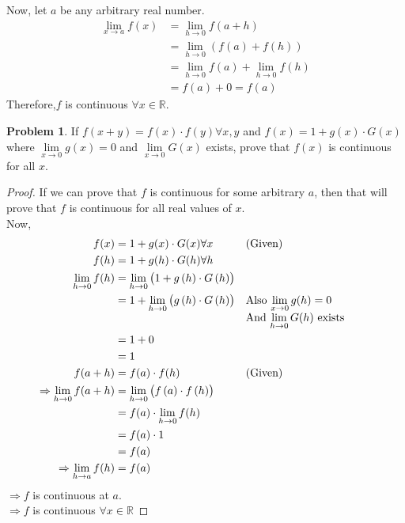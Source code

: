 \documentclass[14]{article}
\theoremstyle{definition}
\newtheorem{prob}{Problem}
\theoremstyle{case}
\begin{document}
Now, let $a$ be any arbitrary real number.
\begin{align*}
\lim\limits_{x \to a} f(x) &= \lim\limits_{h \to 0} f(a + h)\\
&= \lim\limits_{h \to 0} \left( f(a) + f(h) \right)\\
&= \lim\limits_{h \to 0} f(a) + \lim\limits_{h \to 0} f(h)\\
&= f(a) + 0 = f(a)
\end{align*}
Therefore,$f$ is continuous $\forall x \in \mathbb{R}$.
\pagebreak
\begin{prob}
If $f(x + y) = f(x) \cdot f(y) \forall x, y$ and $f(x) = 1 + g(x) \cdot G(x)$ where $\lim\limits_{x \to 0} g(x) = 0$ and $\lim\limits_{x \to 0} G(x)$ exists, prove that $f(x)$ is continuous for all $x$.
\begin{proof}
If we can prove that $f$ is continuous for some arbitrary $a$, then that will prove that $f$ is continuous for all real values of $x$.\\
Now,
\begin{align*}
f(x) &= 1 + g(x) \cdot G(x) \forall x && \text{(Given)}\\
f(h) &= 1 + g(h) \cdot G(h) \forall h\\
\lim\limits_{h \to 0} f(h) &= \lim\limits_{h \to 0} \left( 1 + g\left( h \right) \cdot G\left( h \right) \right)\\
&=  1 + \lim\limits_{h \to 0} \left(g\left( h \right) \cdot G\left( h \right) \right) &&\parbox[t]{4cm}{Also $\lim\limits_{x \to 0} g(h) = 0$\\And $\lim\limits_{h \to 0} G(h)$ exists}\\
&= 1 + 0\\
&= 1\\
f(a+h) &= f(a) \cdot f(h) && \text{(Given)}\\
\Rightarrow \lim\limits_{h \to 0} f(a+h) &= \lim\limits_{h \to 0} \left( f\left( a \right) \cdot f \left( h \right) \right)\\
&= f(a) \cdot \lim\limits_{h \to 0} f(h)\\
&= f(a) \cdot 1\\
&= f(a)\\
\Rightarrow \lim\limits_{h \to a} f(h) &= f(a)
\end{align*}
$\Rightarrow f$ is continuous at $a$.\\
$\Rightarrow f$ is continuous $\forall x \in \mathbb{R}$
\end{proof}
\end{prob}
\end{document}
